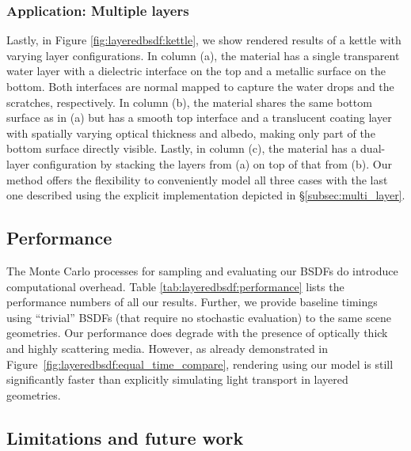 

\subsubsection{Application: Multiple layers}

Lastly, in Figure \ref{fig:layeredbsdf:kettle}, we show rendered results of a kettle with varying layer configurations.
In column (a), the material has a single transparent water layer with a dielectric interface on the top and a metallic surface on the bottom.
Both interfaces are normal mapped to capture the water drops and the scratches, respectively.
In column (b), the material shares the same bottom surface as in (a) but has a smooth top interface and a translucent coating layer with spatially varying optical thickness and albedo, making only part of the bottom surface directly visible.
Lastly, in column (c), the material has a dual-layer configuration by stacking the layers from (a) on top of that from (b).
Our method offers the flexibility to conveniently model all three cases with the last one described using the explicit implementation depicted in \S\ref{subsec:multi_layer}.



\subsection{Performance}

The Monte Carlo processes for sampling and evaluating our BSDFs do introduce computational overhead.
Table \ref{tab:layeredbsdf:performance} lists the performance numbers of all our results.
Further, we provide baseline timings using ``trivial'' BSDFs (that require no stochastic evaluation) to the same scene geometries.
Our performance does degrade with the presence of optically thick and highly scattering media.
However, as already demonstrated in Figure~\ref{fig:layeredbsdf:equal_time_compare}, rendering using our model is still significantly faster than explicitly simulating light transport in layered geometries.



\subsection{Limitations and future work}
\label{subsec:limitation}

